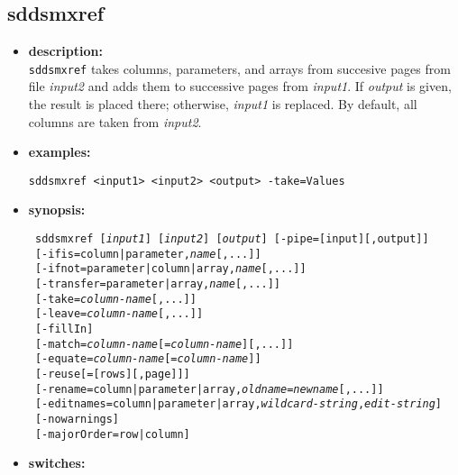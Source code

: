\newpage 
\subsection{sddsmxref} 
\label{sddsmxref} 
 
\begin{itemize} 
\item {\bf description:} \hspace*{1mm}\\ 
{\tt sddsmxref} takes columns, parameters, and arrays from succesive pages from file {\em input2} and adds them to successive pages from {\em input1}. If {\em output} is given, the result is placed there; otherwise, {\em input1} is replaced. By default, all columns are taken from {\em input2}.
\item {\bf examples:} 
\begin{flushleft}
{\tt sddsmxref <input1> <input2> <output> -take=Values }
\end{flushleft} 
\item {\bf synopsis:}  
\begin{flushleft}
{\tt 
sddsmxref [{\em input1}] [{\em input2}] [{\em output}] [-pipe=[input][,output]] \\ \
{}[-ifis={column|parameter},{\em name}[,...]] \\ \
{}[-ifnot={parameter|column|array},{\em name}[,...]] \\ \
{}[-transfer={parameter|array},{\em name}[,...]] \\ \
{}[-take={\em column-name}[,...]]  \\ \
{}[-leave={\em column-name}[,...]] \\ \
{}[-fillIn] \\ \
{}[-match={\em column-name}[={\em column-name}][,...]] \\ \
{}[-equate={\em column-name}[={\em column-name}]]  \\ \
{}[-reuse[=[rows][,page]]] \\ \
{}[-rename={column|parameter|array},{\em oldname}={\em newname}[,...]] \\ \
{}[-editnames={column|parameter|array},{\em wildcard-string},{\em edit-string}] \\ \
{}[-nowarnings] \\ \
{}[-majorOrder=row|column]}
\end{flushleft} 
\item {\bf switches:} 
    \begin{itemize} 

\end{itemize}
\end{itemize}
